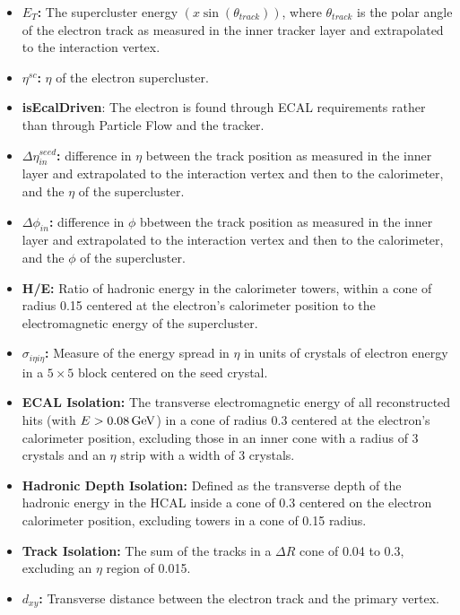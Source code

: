\begin{itemize}
\itemsep-1em 
\item \textbf{$E_T$:} The supercluster energy $(x \sin(\theta_{track}))$, where $\theta_{track}$ is the polar angle of the electron track as measured in the inner tracker layer and extrapolated to the interaction vertex. \newline
\item \textbf{$\eta^{sc}$:} $\eta$ of the electron supercluster.\newline
\item \textbf{isEcalDriven}: The electron is found through ECAL requirements rather than through Particle Flow and the tracker.\newline
\item \textbf{$\Delta \eta_{in}^{seed}$:} difference in $\eta$ between the track position as measured in the inner layer and extrapolated to the interaction vertex and then to the calorimeter, and the $\eta$ of the supercluster. \newline
\item \textbf{$\Delta\phi_{in}$:} difference in $\phi$ bbetween the track position as measured in the inner layer and extrapolated to the interaction vertex and then to the calorimeter, and the $\phi$ of the supercluster. \newline
\item \textbf{H/E:} Ratio of hadronic energy in the calorimeter towers, within a cone of radius 0.15 centered at the electron's calorimeter position to the electromagnetic energy of the supercluster.\newline
\item \textbf{$\sigma_{i \eta i \eta}$:} Measure of the energy spread in $\eta$ in units of crystals of electron energy in a $5 \times 5$ block centered on the seed crystal.\newline
\item \textbf{ECAL Isolation:} The transverse electromagnetic energy of all reconstructed hits (with $E > 0.08 \,\text{Ge\hspace{-.08em}V}$) in a cone of radius 0.3 centered at the electron's calorimeter position, excluding those in an inner cone with a radius of 3 crystals and an $\eta$ strip with a width of 3 crystals.\newline
\item \textbf{Hadronic Depth Isolation:} Defined as the transverse depth of the hadronic energy in the HCAL inside a cone of 0.3 centered on the electron calorimeter position, excluding towers in a cone of 0.15 radius.\newline
\item \textbf{Track \PT Isolation:} The sum \PT of the tracks in a $\Delta R$ cone of 0.04 to 0.3, excluding an $\eta$ region of 0.015.\newline
\item \textbf{$d_{xy}$:} Transverse distance between the electron track and the primary vertex.\newline
\end{itemize}
